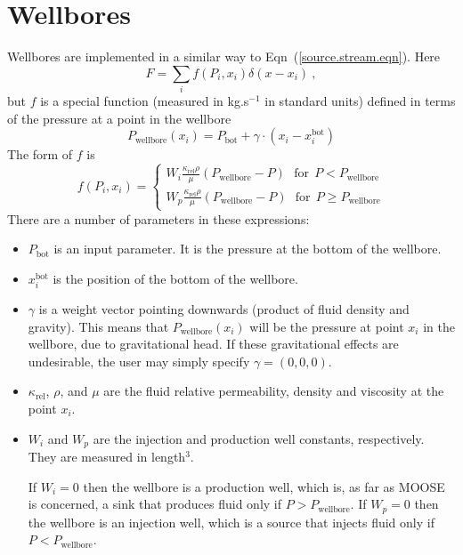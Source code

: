 \documentclass[]{scrreprt}
\begin{document}
\section{Wellbores}

Wellbores are implemented in a similar way to
Eqn~(\ref{source.stream.eqn}).  Here
\begin{equation}
F = \sum_{i}f(P_{i}, x_{i})\delta(x - x_{i}) \ ,
\end{equation}
but $f$ is a special function (measured in kg.s$^{-1}$ in standard
units) defined in terms of the pressure at a
point in the wellbore
\begin{equation}
P_{\mathrm{wellbore}}(x_{i}) = P_{\mathrm{bot}} + \gamma \cdot (x_{i} -
x_{i}^{\mathrm{bot}})
\end{equation}
The form of $f$ is
\begin{equation}
f(P_{i}, x_{i}) = \left\{
\begin{array}{ll}
W_{i}\frac{\kappa_{\mathrm{rel}}\rho}{\mu}(P_{\mathrm{wellbore}} - P)
\ \ \ \mbox{for}\ \ P<P_{\mathrm{wellbore}} \\
W_{p}\frac{\kappa_{\mathrm{rel}}\rho}{\mu}(P_{\mathrm{wellbore}} - P)
\ \ \ \mbox{for}\ \ P\geq P_{\mathrm{wellbore}}
\end{array}
\right.
\end{equation}
There are a number of parameters in these expressions:
\begin{itemize}
\item $P_{\mathrm{bot}}$ is an input parameter.  It is the pressure at
  the bottom of the wellbore.
\item $x_{i}^{\mathrm{bot}}$ is the position of the bottom of the wellbore.
\item $\gamma$ is a weight vector pointing downwards (product of fluid
  density and gravity).  This means that
  $P_{\mathrm{wellbore}}(x_{i})$ will be the pressure at point $x_{i}$
  in the wellbore, due to gravitational head.  If these
  gravitational effects are undesirable, the user may simply specify
  $\gamma = (0,0,0)$.
\item $\kappa_{\mathrm{rel}}$, $\rho$, and $\mu$ are the fluid
  relative permeability, density and viscosity at the point $x_{i}$.
\item $W_{i}$ and $W_{p}$ are the injection and production well
  constants, respectively.  They are measured in length$^{3}$.

If $W_{i}=0$ then the wellbore is a production well, which is, as far
as MOOSE is concerned, a sink that produces fluid only if $P >
P_{\mathrm{wellbore}}$.  If $W_{p}=0$ then the wellbore is an
injection well, which is a source that injects fluid only if $P <
P_{\mathrm{wellbore}}$.

\end{itemize}
\end{document}
